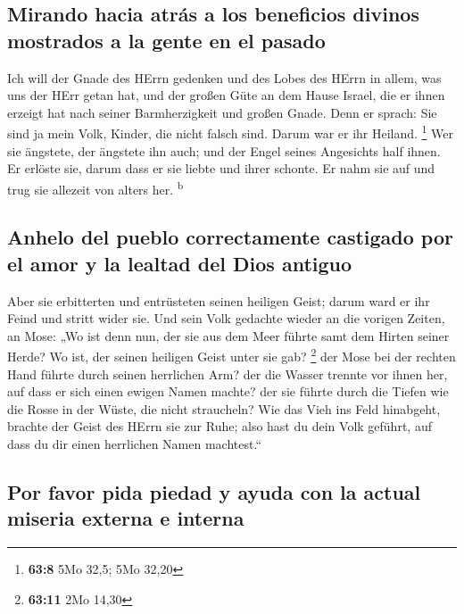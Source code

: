 \hypertarget{mirando-hacia-atruxe1s-a-los-beneficios-divinos-mostrados-a-la-gente-en-el-pasado}{%
\subsection{Mirando hacia atrás a los beneficios divinos mostrados a la
gente en el
pasado}\label{mirando-hacia-atruxe1s-a-los-beneficios-divinos-mostrados-a-la-gente-en-el-pasado}}

 Ich will der Gnade des HErrn gedenken und des Lobes des
HErrn in allem, was uns der HErr getan hat, und der großen Güte an dem
Hause Israel, die er ihnen erzeigt hat nach seiner Barmherzigkeit und
großen Gnade.  Denn er sprach: Sie sind ja mein Volk,
Kinder, die nicht falsch sind. Darum war er ihr Heiland. \footnote{\textbf{63:8}
  5Mo 32,5; 5Mo 32,20}  Wer sie ängstete, der ängstete ihn
auch; und der Engel seines Angesichts half ihnen. Er erlöste sie, darum
dass er sie liebte und ihrer schonte. Er nahm sie auf und trug sie
allezeit von alters her. \textsuperscript{b}

\hypertarget{anhelo-del-pueblo-correctamente-castigado-por-el-amor-y-la-lealtad-del-dios-antiguo}{%
\subsection{Anhelo del pueblo correctamente castigado por el amor y la
lealtad del Dios
antiguo}\label{anhelo-del-pueblo-correctamente-castigado-por-el-amor-y-la-lealtad-del-dios-antiguo}}

 Aber sie erbitterten und entrüsteten seinen heiligen
Geist; darum ward er ihr Feind und stritt wider sie.  Und
sein Volk gedachte wieder an die vorigen Zeiten, an Mose: „Wo ist denn
nun, der sie aus dem Meer führte samt dem Hirten seiner Herde? Wo ist,
der seinen heiligen Geist unter sie gab? \footnote{\textbf{63:11} 2Mo
  14,30}  der Mose bei der rechten Hand führte durch
seinen herrlichen Arm? der die Wasser trennte vor ihnen her, auf dass er
sich einen ewigen Namen machte?  der sie führte durch die
Tiefen wie die Rosse in der Wüste, die nicht straucheln? 
Wie das Vieh ins Feld hinabgeht, brachte der Geist des HErrn sie zur
Ruhe; also hast du dein Volk geführt, auf dass du dir einen herrlichen
Namen machtest.``

\hypertarget{por-favor-pida-piedad-y-ayuda-con-la-actual-miseria-externa-e-interna}{%
\subsection{Por favor pida piedad y ayuda con la actual miseria externa
e
interna}\label{por-favor-pida-piedad-y-ayuda-con-la-actual-miseria-externa-e-interna}}

